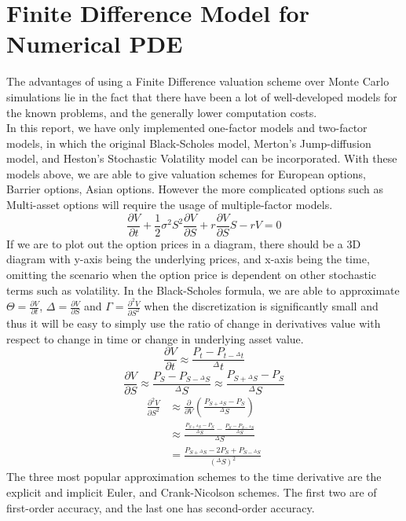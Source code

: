 \section{Finite Difference Model for Numerical PDE}
The advantages of using a Finite Difference valuation scheme over Monte Carlo simulations lie in the fact that there have been a lot of well-developed models for the known problems, and the generally lower computation costs.\\
In this report, we have only implemented one-factor models and two-factor models, in which the original Black-Scholes model, Merton's Jump-diffusion model, and Heston's Stochastic Volatility model can be incorporated. With these models above, we are able to give valuation schemes for European options, Barrier options, Asian options. However the more complicated options such as Multi-asset options will require the usage of multiple-factor models.
$$\frac{\partial V}{\partial t}+\frac{1}{2}\sigma^{2}S^{2}\frac{\partial V}{\partial S}+r\frac{\partial V}{\partial S}S- rV = 0$$
If we are to plot out the option prices in a diagram, there should be a 3D diagram with y-axis being the underlying prices, and x-axis being the time, omitting the scenario when the option price is dependent on other stochastic terms such as volatility.
In the Black-Scholes formula, we are able to approximate $\Theta = \frac{\partial V}{\partial t}$, $\Delta = \frac{\partial V}{\partial S}$ and $\Gamma = \frac{\partial^{2} V}{\partial S^{2}}$ when the discretization is significantly small and thus it will be easy to simply use the ratio of change in derivatives value with respect to change in time or change in underlying asset value.\\
$$\frac{\partial V}{\partial t} \approx \frac{P_{t} - P_{t-{^{\Delta}t}}}{^{\Delta}t}$$
$$\frac{\partial V}{\partial S} \approx \frac{P_{S} - P_{S-{^{\Delta}S}}}{^{\Delta}S} \approx \frac{P_{S+{^{\Delta}S}} - P_{S}}{^{\Delta}S}$$
\begin{equation}
\begin{split}
\frac{\partial^{2} V}{\partial S^{2}}
&\approx \frac{\partial}{\partial V}(\frac{P_{S+{^{\Delta}S}} - P_{S}}{^{\Delta}S})\\
&\approx \frac{\frac{P_{S+{^{\Delta}S}} - P_{S}}{^{\Delta}S} - \frac{P_{S} - P_{S-{^{\Delta}S}}}{^{\Delta}S}}{^{\Delta}S}\\
&= \frac{P_{S+{^{\Delta}S}} - 2P_{S} + P_{S-{^{\Delta}S}}}{(^{\Delta}S)^{2}}
\end{split}
\end{equation}
The three most popular approximation schemes to the time derivative are the explicit and implicit Euler, and Crank-Nicolson schemes. The first two are of first-order accuracy, and the last one has second-order accuracy.
\newpage

